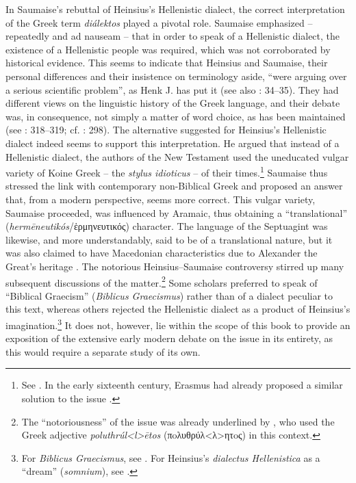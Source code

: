 In Saumaise’s rebuttal of Heinsius’s Hellenistic dialect, the correct interpretation of the Greek term \textit{diálektos} played a pivotal role. Saumaise emphasized – repeatedly and ad nauseam – that in order to speak of a Hellenistic dialect, the existence of a Hellenistic people was required, which was not corroborated by historical evidence. This seems to indicate that Heinsius and Saumaise, their personal differences and their insistence on terminology aside, “were arguing over a serious scientific problem”, as Henk J. \citet[117]{De1981} has put it (see also : 34–35). They had different views on the linguistic history of the Greek language, and their debate was, in consequence, not simply a matter of word choice, as has been maintained (see \citealt{Simon1689}: 318--319; cf. \citealt{Considine2012}: 298). The alternative \citet[98–99, 240–266]{Saumaise1643a} suggested for Heinsius’s Hellenistic dialect indeed seems to support this interpretation. He argued that instead of a Hellenistic dialect, the authors of the New Testament used the uneducated vulgar variety of Koine Greek – the \textit{stylus idioticus} – of their times.\footnote{See . In the early sixteenth century, Erasmus had already proposed a similar solution to the issue \citep[181]{Bentley1983}.} Saumaise thus stressed the link with contemporary non-Biblical Greek and proposed an answer that, from a modern perspective, seems more correct. This vulgar variety, Saumaise proceeded, was influenced by Aramaic, thus obtaining a “translational” (\textit{hermēneutikós}/ἑρμηνευτικός) character. The language of the Septuagint was likewise, and more understandably, said to be of a translational nature, but it was also claimed to have Macedonian characteristics due to Alexander the Great’s heritage \citep[264]{Saumaise1643a}. The notorious Heinsius–Saumaise controversy stirred up many subsequent discussions of the matter.\footnote{The “notoriousness” of the issue was already underlined by \citet[\textsc{ii.}74]{Morhof1708}, who used the Greek adjective \textit{poluthrúl<l>ētos}  (πoλυθρύλ<λ>ητoς) in this context.} Some scholars preferred to speak of “Biblical Graecism” (\textit{Biblicus Graecismus}) rather than of a dialect peculiar to this text, whereas others rejected the Hellenistic dialect as a product of Heinsius’s imagination.\footnote{For \textit{Biblicus Graecismus}, see \citet[\textsc{b.3}\textsc{\textsuperscript{v}}]{Bolius1689}. For Heinsius’s \textit{dialectus Hellenistica} as a “dream” (\textit{somnium}), see \citet{De1644}.} It does not, however, lie within the scope of this book to provide an exposition of the extensive early modern debate on the issue in its entirety, as this would require a separate study of its own.

